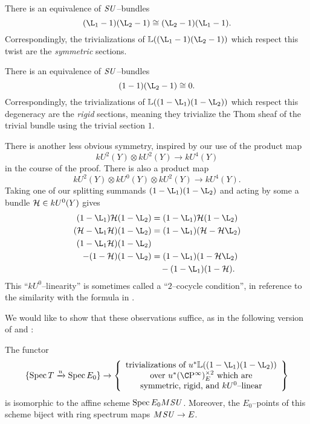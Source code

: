 \begin{example}
There is an equivalence of \(\mathit{SU}\)--bundles \[(\L_1 - 1)(\L_2 - 1) \cong (\L_2 - 1)(\L_1 - 1).\]  Correspondingly, the trivializations of \(\ThomSheaf{(\L_1 - 1)(\L_2 - 1)}\) which respect this twist are the \emph{symmetric} sections.
\end{example}

\begin{example}
There is an equivalence of \(\mathit{SU}\)--bundles \[(1 - 1)(\L_2 - 1) \cong 0.\]  Correspondingly, the trivializations of \(\ThomSheaf{(1 - \L_1)(1 - \L_2)}\) which respect this degeneracy are the \emph{rigid} sections, meaning they trivialize the Thom sheaf of the trivial bundle using the trivial section \(1\).
\end{example}

\begin{example}\label{TwoCocycleConditionForBSUBundles}
There is another less obvious symmetry, inspired by our use of the product map \[kU^2(Y) \otimes kU^2(Y) \to kU^4(Y)\] in the course of the proof.  There is also a product map \[kU^2(Y) \otimes kU^0(Y) \otimes kU^2(Y) \to kU^4(Y).\]  Taking one of our splitting summands \((1 - \L_1)(1 - \L_2)\) and acting by some a bundle \(\mathcal{H} \in kU^0(Y)\) gives
\begin{align*}
(1 - \L_1)\sheaf H(1 - \L_2) & = (1 - \L_1)\sheaf H(1 - \L_2) \\
(\sheaf H - \L_1 \sheaf H)(1 - \L_2) & = (1 - \L_1)(\sheaf H - \sheaf H \L_2) \\
(1 - \L_1 \sheaf H)(1 - \L_2) & \\
- (1 - \sheaf H)(1 - \L_2) & = (1 - \L_1)(1 - \sheaf H \L_2) \\
& \quad - (1 - \L_1)(1 - \sheaf H).
\end{align*}
This ``\(kU^0\)--linearity'' is sometimes called a ``\(2\)--cocycle condition'', in reference to the similarity with the formula in .
\end{example}

We would like to show that these observations suffice, as in the following version of  and :
\begin{theorem}\label{BSUTriumvirate}
The functor \[\{\Spec T \xrightarrow{u} \Spec E_0\} \to \left\{ \begin{array}{c} \text{trivializations of \(u^* \ThomSheaf{(1 - \L_1)(1 - \L_2)}\)} \\ \text{over \(u^* (\CP^\infty)^{\times 2}_E\) which are} \\ \text{symmetric, rigid, and \(kU^0\)--linear} \end{array} \right\}\] is isomorphic to the affine scheme \(\operatorname{Spec} E_0 M\mathit{SU}\).  Moreover, the \(E_0\)--points of this scheme biject with ring spectrum maps \(M\mathit{SU} \to E\).
\end{theorem}

